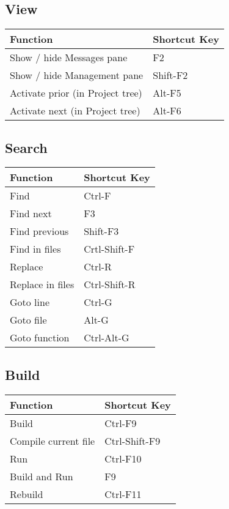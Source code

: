 \subsection{View}

\begin{tabular}{|l|l|}\hline
Function 		&	Shortcut Key\\ \hline
Show / hide Messages pane	&	F2\\ \hline
Show / hide Management pane 	&	Shift-F2\\ \hline
Activate prior (in Project tree) & 	Alt-F5\\ \hline
Activate next (in Project tree)  &	Alt-F6\\ \hline
\end{tabular}

\subsection{Search}

\begin{tabular}{|l|l|}\hline
Function 	&	Shortcut Key\\ \hline
Find 		&	Ctrl-F\\ \hline
Find next 	&	F3\\ \hline
Find previous 	&	Shift-F3\\ \hline
Find in files 	&	Crtl-Shift-F\\ \hline
Replace 	&	Ctrl-R\\ \hline
Replace in files &	Ctrl-Shift-R\\ \hline
Goto line 	&	Ctrl-G\\ \hline
Goto file 	&	Alt-G\\ \hline
Goto function 	&	Ctrl-Alt-G\\ \hline
\end{tabular}

\subsection{Build}

\begin{tabular}{|l|l|}\hline
Function 	&	Shortcut Key\\ \hline
Build 		&	Ctrl-F9\\ \hline
Compile current file	&	Ctrl-Shift-F9\\ \hline
Run		&	Ctrl-F10\\ \hline
Build and Run 	&	F9\\ \hline
Rebuild 	&	Ctrl-F11\\ \hline
\end{tabular}
